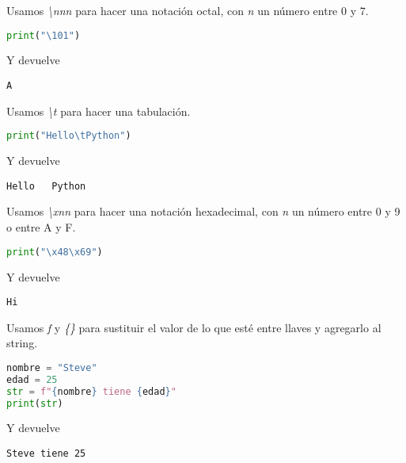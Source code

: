     Usamos \emph{\textbackslash nnn} para hacer una notación octal, con \emph{n} un número entre 0 y 7.
    \begin{lstlisting}[language = {python}]
print("\101")
    \end{lstlisting}
    Y devuelve
    \begin{lstlisting}[language = {[latex]tex}]
A
    \end{lstlisting}
    Usamos \emph{\textbackslash t} para hacer una tabulación.
    \begin{lstlisting}[language = {python}]
print("Hello\tPython")
    \end{lstlisting}
    Y devuelve
    \begin{lstlisting}[language = {[latex]tex}]
Hello	Python
    \end{lstlisting}
    Usamos \emph{\textbackslash xnn} para hacer una notación hexadecimal, con \emph{n} un número entre 0 y 9 o entre A y F.
    \begin{lstlisting}[language = {python}]
print("\x48\x69")
    \end{lstlisting}
    Y devuelve
    \begin{lstlisting}[language = {[latex]tex}]
Hi
    \end{lstlisting}
    Usamos \emph{f} y \emph{\{\}} para sustituir el valor de lo que esté entre llaves y agregarlo al string.
    \begin{lstlisting}[language = {python}]
nombre = "Steve"
edad = 25
str = f"{nombre} tiene {edad}"
print(str)
    \end{lstlisting}
    Y devuelve
    \begin{lstlisting}[language = {[latex]tex}]
Steve tiene 25
    \end{lstlisting}
